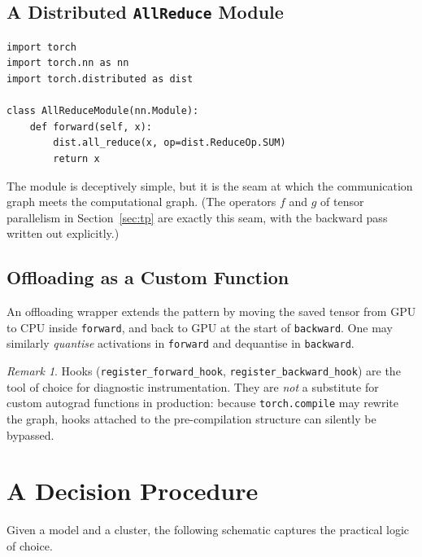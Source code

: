 \documentclass[11pt,a4paper]{article}
\theoremstyle{definition}
\theoremstyle{remark}
\newtheorem*{remark}{Remark}
\theoremstyle{plain}
\begin{document}
\subsection{A Distributed \texttt{AllReduce} Module}

\begin{lstlisting}
import torch
import torch.nn as nn
import torch.distributed as dist

class AllReduceModule(nn.Module):
    def forward(self, x):
        dist.all_reduce(x, op=dist.ReduceOp.SUM)
        return x
\end{lstlisting}

The module is deceptively simple, but it is the seam at which the
communication graph meets the computational graph. (The operators $f$ and
$g$ of tensor parallelism in Section~\ref{sec:tp} are exactly this seam,
with the backward pass written out explicitly.)

\subsection{Offloading as a Custom Function}

An offloading wrapper extends the pattern by moving the saved tensor from
GPU to CPU inside \texttt{forward}, and back to GPU at the start of
\texttt{backward}. One may similarly \emph{quantise} activations in
\texttt{forward} and dequantise in \texttt{backward}.

\begin{remark}
Hooks (\texttt{register\_forward\_hook},
\texttt{register\_backward\_hook}) are the tool of choice for diagnostic
instrumentation. They are \emph{not} a substitute for custom autograd
functions in production: because \texttt{torch.compile} may rewrite the
graph, hooks attached to the pre-compilation structure can silently be
bypassed.
\end{remark}

\section{A Decision Procedure}

Given a model and a cluster, the following schematic captures the
practical logic of choice.
\end{document}
